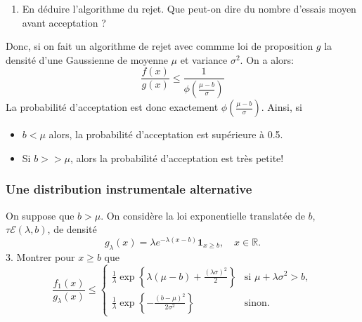 \documentclass[
]{article}
\providecommand{\tightlist}{%
  \setlength{\itemsep}{0pt}\setlength{\parskip}{0pt}}
\newenvironment{Correction}%
  { \vspace{\baselineskip}\begin{mdframed}[backgroundcolor=my_green]}%
  {\end{mdframed}}
\begin{document}
\begin{enumerate}
\def\labelenumi{\arabic{enumi}.}
\setcounter{enumi}{1}
\tightlist
\item
  En déduire l'algorithme du rejet. Que peut-on dire du nombre d'essais
  moyen avant acceptation ?
\end{enumerate}

\begin{Correction}
Donc, si on fait un algorithme de rejet avec commme loi de proposition $g$ la densité d'une Gaussienne de moyenne $\mu$ et variance $\sigma^2$.
On a alors:
$$\frac{f(x)}{g(x)} \leq \frac{1}{\phi(\frac{\mu-b}{\sigma})}$$
La probabilité d'acceptation est donc exactement $\phi(\frac{\mu-b}{\sigma})$.
Ainsi, si

\begin{itemize}
\item $b < \mu$ alors, la probabilité d'acceptation est supérieure à 0.5.
\item Si $b >> \mu$, alors la probabilité d'acceptation est très petite!
\end{itemize}
\end{Correction}

\hypertarget{une-distribution-instrumentale-alternative}{%
\subsubsection{Une distribution instrumentale
alternative}\label{une-distribution-instrumentale-alternative}}

On suppose que \(b > \mu\). On considère la loi exponentielle translatée
de \(b\), \(\tau\mathcal{E}(\lambda, b)\), de densité
\[g_{\lambda}(x) = \lambda e^{-\lambda(x-b)}\mathbf{1}_{x\geq b},\quad x\in\mathbb{R}.\]
3. Montrer pour \(x\geq b\) que
\[\frac{f_1(x)}{g_{\lambda}(x)}\leq \left\lbrace
\begin{array}{lr}
\frac{1}{\lambda}\exp\left\lbrace
    \lambda(\mu-b)+\frac{(\lambda\sigma)^2}{2}
    \right\rbrace & \text{si } \mu+\lambda\sigma^2 > b,\\
    \frac{1}{\lambda}\exp\left\lbrace
    -\frac{(b-\mu)^2}{2\sigma^2}
    \right\rbrace & \text{sinon}.
\end{array}
\right. \]
\end{document}
